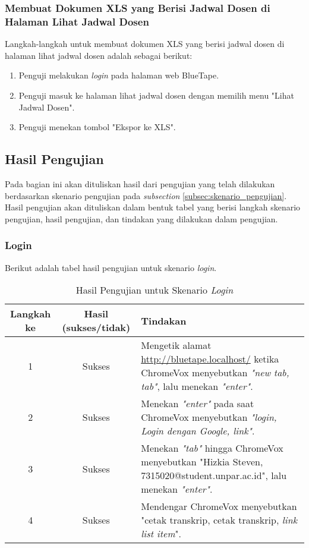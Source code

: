 \subsubsection{Membuat Dokumen XLS yang Berisi Jadwal Dosen di Halaman Lihat Jadwal Dosen}
\label{subsubsec:skenario_membuat_dokumen_xls_yang_berisi_jadwal_dosen_di_halaman_lihat_jadwal_dosen}
Langkah-langkah untuk membuat dokumen XLS yang berisi jadwal dosen di halaman lihat jadwal dosen adalah sebagai berikut:

\begin{enumerate}
    \item Penguji melakukan \textit{login} pada halaman web BlueTape.
    \item Penguji masuk ke halaman lihat jadwal dosen dengan memilih menu "Lihat Jadwal Dosen".
    \item Penguji menekan tombol "Ekspor ke XLS".
\end{enumerate}

\subsection{Hasil Pengujian}
\label{subsec:hasil_pengujian}
Pada bagian ini akan dituliskan hasil dari pengujian yang telah dilakukan berdasarkan skenario pengujian pada \textit{subsection} \ref{subsec:skenario_pengujian}. Hasil pengujian akan dituliskan dalam bentuk tabel yang berisi langkah skenario pengujian, hasil pengujian, dan tindakan yang dilakukan dalam pengujian.

\subsubsection{Login}
\label{subsubsec:hasil_pengujian_login}
Berikut adalah tabel hasil pengujian untuk skenario \textit{login}.

\begin{table}[H]
    \centering 
    \caption{Hasil Pengujian untuk Skenario \textit{Login}}
    \label{tab:hasil_pengujian_login}
    \begin{tabular}{|c|c|p{10cm}|}
        \toprule
        Langkah ke & Hasil (sukses/tidak) & Tindakan \\

        \midrule
        1 & Sukses & Mengetik alamat \url{http://bluetape.localhost/} ketika ChromeVox menyebutkan \textit{"new tab, tab"}, lalu menekan \textit{"enter"}. \\
        2 & Sukses & Menekan \textit{"enter"} pada saat ChromeVox menyebutkan \textit{"login, Login dengan Google, link"}. \\
        3 & Sukses & Menekan \textit{"tab"} hingga ChromeVox menyebutkan "Hizkia Steven, 7315020@student.unpar.ac.id", lalu menekan \textit{"enter"}. \\
        4 & Sukses & Mendengar ChromeVox menyebutkan "cetak transkrip, cetak transkrip, \textit{link list item}". \\

        \bottomrule

    \end{tabular}
\end{table}

